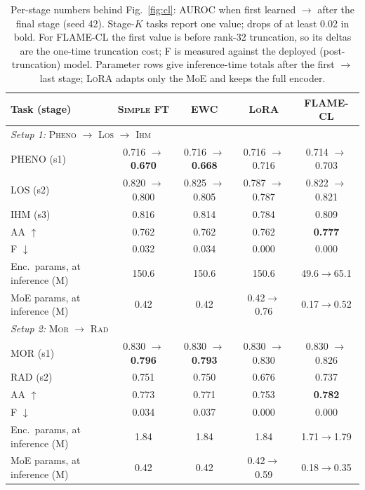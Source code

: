 \begin{table}[t]
\centering
\footnotesize
\setlength{\tabcolsep}{3.5pt}
\caption{Per-stage numbers behind Fig.~\ref{fig:cl}: AUROC when first learned $\to$ after the final stage (seed 42). Stage-$K$ tasks report one value; drops of at least 0.02 in bold. For \textsc{FLAME-CL} the first value is before rank-32 truncation, so its deltas are the one-time truncation cost; F is measured against the deployed (post-truncation) model. Parameter rows give inference-time totals after the first $\to$ last stage; \textsc{LoRA} adapts only the MoE and keeps the full encoder.}
\label{tab:cl-fig5-per-stage}
\begin{tabular}{lcccc}
\toprule
Task (stage) & \textsc{Simple FT} & EWC & \textsc{LoRA} & \textsc{FLAME-CL} \\
\midrule
\multicolumn{5}{l}{\emph{Setup 1:} \textsc{Pheno} $\to$ \textsc{Los} $\to$ \textsc{Ihm}} \\
\addlinespace[1pt]
PHENO (s1) & 0.716 $\to$ \textbf{0.670} & 0.716 $\to$ \textbf{0.668} & 0.716 $\to$ 0.716 & 0.714 $\to$ 0.703 \\
LOS (s2) & 0.820 $\to$ 0.800 & 0.825 $\to$ 0.805 & 0.787 $\to$ 0.787 & 0.822 $\to$ 0.821 \\
IHM (s3) & 0.816 & 0.814 & 0.784 & 0.809 \\
\addlinespace[1pt]
AA $\uparrow$ & 0.762 & 0.762 & 0.762 & \textbf{0.777} \\
F $\downarrow$ & 0.032 & 0.034 & 0.000 & 0.000 \\
Enc.\ params, at inference (M) & 150.6 & 150.6 & 150.6 & 49.6$\to$65.1 \\
MoE params, at inference (M) & 0.42 & 0.42 & 0.42$\to$0.76 & 0.17$\to$0.52 \\
\midrule
\multicolumn{5}{l}{\emph{Setup 2:} \textsc{Mor} $\to$ \textsc{Rad}} \\
\addlinespace[1pt]
MOR (s1) & 0.830 $\to$ \textbf{0.796} & 0.830 $\to$ \textbf{0.793} & 0.830 $\to$ 0.830 & 0.830 $\to$ 0.826 \\
RAD (s2) & 0.751 & 0.750 & 0.676 & 0.737 \\
\addlinespace[1pt]
AA $\uparrow$ & 0.773 & 0.771 & 0.753 & \textbf{0.782} \\
F $\downarrow$ & 0.034 & 0.037 & 0.000 & 0.000 \\
Enc.\ params, at inference (M) & 1.84 & 1.84 & 1.84 & 1.71$\to$1.79 \\
MoE params, at inference (M) & 0.42 & 0.42 & 0.42$\to$0.59 & 0.18$\to$0.35 \\

\end{tabular}
\end{table}
